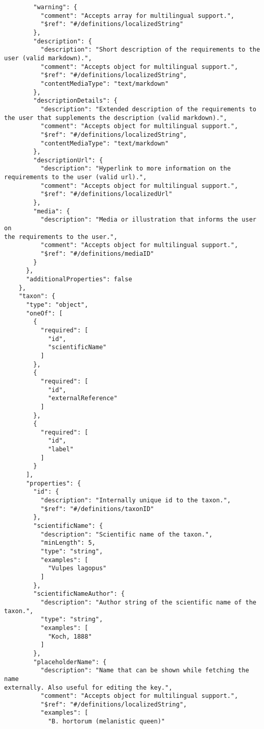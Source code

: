 \documentclass[10pt,letterpaper]{article}
\begin{document}
\begin{verbatim}
        "warning": {
          "comment": "Accepts array for multilingual support.",
          "$ref": "#/definitions/localizedString"
        },
        "description": {
          "description": "Short description of the requirements to the
user (valid markdown).",
          "comment": "Accepts object for multilingual support.",
          "$ref": "#/definitions/localizedString",
          "contentMediaType": "text/markdown"
        },
        "descriptionDetails": {
          "description": "Extended description of the requirements to
the user that supplements the description (valid markdown).",
          "comment": "Accepts object for multilingual support.",
          "$ref": "#/definitions/localizedString",
          "contentMediaType": "text/markdown"
        },
        "descriptionUrl": {
          "description": "Hyperlink to more information on the
requirements to the user (valid url).",
          "comment": "Accepts object for multilingual support.",
          "$ref": "#/definitions/localizedUrl"
        },
        "media": {
          "description": "Media or illustration that informs the user on
the requirements to the user.",
          "comment": "Accepts object for multilingual support.",
          "$ref": "#/definitions/mediaID"
        }
      },
      "additionalProperties": false
    },
    "taxon": {
      "type": "object",
      "oneOf": [
        {
          "required": [
            "id",
            "scientificName"
          ]
        },
        {
          "required": [
            "id",
            "externalReference"
          ]
        },
        {
          "required": [
            "id",
            "label"
          ]
        }
      ],
      "properties": {
        "id": {
          "description": "Internally unique id to the taxon.",
          "$ref": "#/definitions/taxonID"
        },
        "scientificName": {
          "description": "Scientific name of the taxon.",
          "minLength": 5,
          "type": "string",
          "examples": [
            "Vulpes lagopus"
          ]
        },
        "scientificNameAuthor": {
          "description": "Author string of the scientific name of the
taxon.",
          "type": "string",
          "examples": [
            "Koch, 1888"
          ]
        },
        "placeholderName": {
          "description": "Name that can be shown while fetching the name
externally. Also useful for editing the key.",
          "comment": "Accepts object for multilingual support.",
          "$ref": "#/definitions/localizedString",
          "examples": [
            "B. hortorum (melanistic queen)"

\end{verbatim}
\end{document}
